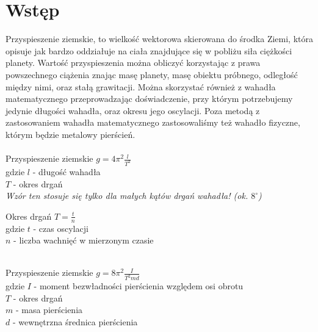 {\section{Wstęp}}

Przyspieszenie ziemskie, to wielkość wektorowa skierowana do środka Ziemi, która opisuje jak bardzo oddziałuje na ciała znajdujące się w pobliżu siła ciężkości planety.
Wartość przyspieszenia można obliczyć korzystając z prawa powszechnego ciążenia znając masę planety, masę obiektu próbnego, odległość między nimi, oraz stałą grawitacji.
Można skorzystać również z wahadła matematycznego przeprowadzając doświadczenie, przy którym potrzebujemy jedynie długości wahadła, oraz okresu jego oscylacji.
Poza metodą z zastosowaniem wahadła matematycznego zastosowaliśmy też wahadło fizyczne, którym będzie metalowy pierścień. \\

 \\

Przyspieszenie ziemskie \dotfill \quad $\displaystyle g = 4\pi^2 \frac{l}{T^2}$ \\
{ \small
    \indent \qquad gdzie $l$ - długość wahadła \\
    \indent \qquad $T$ - okres drgań \\
    \indent \qquad \textit{Wzór ten stosuje się tylko dla małych kątów drgań wahadła! (ok. $8^{\circ}$)} \\
}

Okres drgań \dotfill \quad $\displaystyle  T = \frac{t}{n}$ \\
{ \small
    \indent \qquad gdzie $t$ - czas oscylacji \\
    \indent \qquad $n$ - liczba wachnięć w mierzonym czasie \\
}

 \\

Przyspieszenie ziemskie \dotfill \quad $\displaystyle g = 8\pi^2 \frac{I}{T^2 md}$ \\
{ \small
    \indent \qquad gdzie $I$ - moment bezwładności pierścienia względem osi obrotu \\
    \indent \qquad $T$ - okres drgań \\
    \indent \qquad $m$ - masa pierścienia \\
    \indent \qquad $d$ - wewnętrzna średnica pierścienia \\
}

